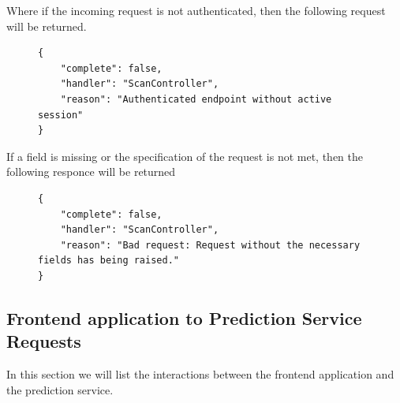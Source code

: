 					Where if the incoming request is not authenticated, then the following request will be returned.
					\begin{figure}[H]
						\iftrue
						\begin{lstlisting}[]
{
	"complete": false,
	"handler": "ScanController",
	"reason": "Authenticated endpoint without active session"
}						
						\end{lstlisting}
					\end{figure}
					If a field is missing or the specification of the request is not met, then the following responce will be returned
					\begin{figure}[H]
						\iftrue
						\begin{lstlisting}[]
{
	"complete": false,
	"handler": "ScanController",
	"reason": "Bad request: Request without the necessary fields has being raised."
}					
						\end{lstlisting}
					\end{figure}
					
			\subsection{Frontend application to Prediction Service Requests}
				In this section we will list the interactions between the frontend application and the prediction service. 
